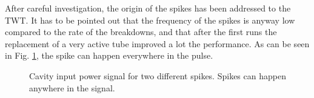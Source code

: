  After careful investigation, the origin of the spikes has been addressed to the TWT. It has to be pointed out that the frequency of the spikes is anyway low compared to the rate of the breakdowns, and that after the first runs the replacement of a very active tube improved a lot the performance. As can be seen in Fig. \ref{spikesAndDetuning}, the spike can happen everywhere in the pulse.

 \begin{figure}[h]
 \centering
 \hspace{2mm}
 \caption{Cavity input power signal for two different spikes. Spikes can happen anywhere in the signal.}
 \label{spikesAndDetuning}
 \end{figure}

